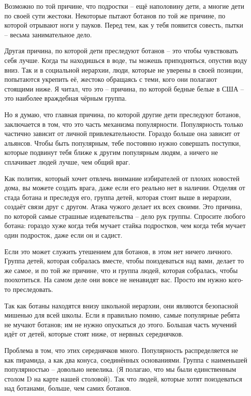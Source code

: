 \documentclass[ebook,12pt,oneside,openany]{memoir}
\begin{document}
Возможно по той причине, что подростки – ещё наполовину дети, а многие
дети по своей сути жестоки. Некоторые пытают ботанов по той же
причине, по которой отрывают ноги у пауков. Перед тем, как у тебя
появится совесть, пытки – весьма занимательное дело.

Другая причина, по которой дети преследуют ботанов – это чтобы
чувствовать себя лучше. Когда ты находишься в воде, ты можешь
приподняться, опустив воду вниз. Так и в социальной иерархии, люди,
которые не уверены в своей позиции, попытаются укрепить её, жестоко
обращаясь с теми, кого они полагают стоящими ниже. Я читал, что это –
причина, по которой бедные белые в США – это наиболее враждебная
чёрным группа.

Но я думаю, что главная причина, по которой другие дети преследуют
ботанов, заключается в том, что это часть механизма популярности.
Популярность только частично зависит от личной привлекательности.
Гораздо больше она зависит от альянсов. Чтобы быть популярным, тебе
постоянно нужно совершать поступки, которые подвинут тебя ближе к
другим популярным людям, а ничего не сплачивает людей лучше, чем общий
враг.

Как политик, который хочет отвлечь внимание избирателей от плохих
новостей дома, вы можете создать врага, даже если его реально нет в
наличии. Отделяя от стада ботана и преследуя его, группа детей,
которая стоит выше в иерархии, создаёт связи друг с другом. Атака
чужого делает их всех своими. Это причина, по которой самые страшные
издевательства – дело рук группы. Спросите любого ботана: гораздо хуже
когда тебя мучает стайка подростков, чем когда тебя мучает один
подросток, даже если он и садист.

Если это может служить утешением для ботанов, в этом нет ничего
личного. Группа детей, которая собралась вместе, чтобы поиздеваться
над вами, делает то же самое, и по той же причине, что и группа людей,
которая собралась, чтобы поохотиться. На самом деле они вовсе не
ненавидят вас. Просто им нужно кого-то преследовать.

Так как ботаны находятся внизу школьной иерархии, они являются
безопасной мишенью для всей школы. Если я правильно помню, самые
популярные ребята не мучают ботанов; им не нужно опускаться до этого.
Большая часть мучений идёт от детей, которые стоят ниже, от нервных
середнячков.

Проблема в том, что этих середнячков много. Популярность
распределяется не как пирамида, а как два конуса, соединённых
основаниями. Группа с наименьшей популярностью – довольно невелика. (Я
полагаю, что мы были единственным столом D на карте нашей столовой).
Так что людей, которые хотят поиздеваться над ботанами, больше, чем
самих ботанов.
\end{document}
